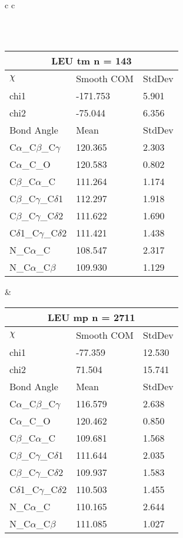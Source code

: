 \begin{longtable}{ c c }
\begin{tabular}{ l l l }
  \bottomrule
  \end{tabular}
  \\
  \begin{tabular}{ l l l }
  \toprule
  \multicolumn{3}{c}{LEU \textbf{tm} n = 143} \\ \toprule
  $\chi$       & Smooth COM & StdDev \\ \midrule
  chi1 & -171.753 & 5.901 \\ 
  chi2 & -75.044 & 6.356 \\ \midrule
  Bond Angle   & Mean     & StdDev \\ \midrule
  C$\alpha$\_C$\beta$\_C$\gamma$ & 120.365 & 2.303\\
  C$\alpha$\_C\_O & 120.583 & 0.802\\
  C$\beta$\_C$\alpha$\_C & 111.264 & 1.174\\
  C$\beta$\_C$\gamma$\_C$\delta$1 & 112.297 & 1.918\\
  C$\beta$\_C$\gamma$\_C$\delta$2 & 111.622 & 1.690\\
  C$\delta$1\_C$\gamma$\_C$\delta$2 & 111.421 & 1.438\\
  N\_C$\alpha$\_C & 108.547 & 2.317\\
  N\_C$\alpha$\_C$\beta$ & 109.930 & 1.129\\
  \bottomrule
  \end{tabular}
  &
  \begin{tabular}{ l l l }
  \toprule
  \multicolumn{3}{c}{LEU \textbf{mp} n = 2711} \\ \toprule
  $\chi$       & Smooth COM & StdDev \\ \midrule
  chi1 & -77.359 & 12.530 \\ 
  chi2 & 71.504 & 15.741 \\ \midrule
  Bond Angle   & Mean     & StdDev \\ \midrule
  C$\alpha$\_C$\beta$\_C$\gamma$ & 116.579 & 2.638\\
  C$\alpha$\_C\_O & 120.462 & 0.850\\
  C$\beta$\_C$\alpha$\_C & 109.681 & 1.568\\
  C$\beta$\_C$\gamma$\_C$\delta$1 & 111.644 & 2.035\\
  C$\beta$\_C$\gamma$\_C$\delta$2 & 109.937 & 1.583\\
  C$\delta$1\_C$\gamma$\_C$\delta$2 & 110.503 & 1.455\\
  N\_C$\alpha$\_C & 110.165 & 2.644\\
  N\_C$\alpha$\_C$\beta$ & 111.085 & 1.027\\
  \bottomrule
  \end{tabular}
  \\
  
\end{longtable}    

